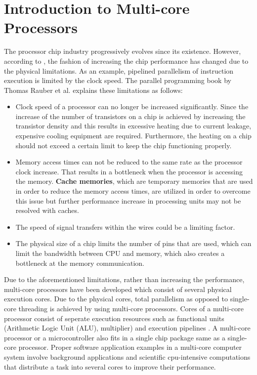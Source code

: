 \section{Introduction to Multi-core Processors} %
The processor chip industry progressively evolves since its existence. However, according to \cite{springerparallel}, the fashion of increasing the chip performance has changed due to the physical limitations. As an example, pipelined parallelism of instruction execution is limited by the clock speed. The parallel programming book by Thomas Rauber et al. \cite{springerparallel} explains these limitations as follows:
\begin{itemize}
	\item Clock speed of a processor can no longer be increased significantly. Since the increase of the number of transistors on a chip is achieved by increasing the transistor density and this results in excessive heating due to current leakage, expensive cooling equipment are required. Furthermore, the heating on a chip should not exceed a certain limit to keep the chip functioning properly.
	\item Memory access times can not be reduced to the same rate as the processor clock increase. That results in a bottleneck when the processor is accessing the memory. \textbf{Cache memories}, which are temporary memories that are used in order to reduce the memory access times, are utilized in order to overcome this issue but further performance increase in processing units may not be resolved with caches.
	\item The speed of signal transfers within the wires could be a limiting factor.
	\item The physical size of a chip limits the number of pins that are used, which can limit the bandwidth between CPU and memory, which also creates a bottleneck at the memory communication.
\end{itemize}
Due to the aforementioned limitations, rather than increasing the performance, multi-core processors have been developed which consist of several physical execution cores. Due to the physical cores, total parallelism as opposed to single-core threading is achieved by using multi-core processors. Cores of a multi-core processor consist of seperate execution resources such as functional units (Arithmetic Logic Unit (ALU), multiplier) and execution pipelines \cite{springerparallel}. A multi-core processor or a microcontroller also fits in a single chip package same as a single-core processor. Proper software application examples in a multi-core computer system involve background applications and scientific cpu-intensive computations that distribute a task into several cores to improve their performance.

